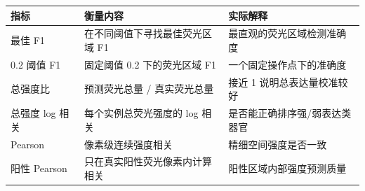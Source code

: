 \begin{tabular}{@{}lll@{}}
\toprule
指标 & 衡量内容 & 实际解释 \\
\midrule
最佳 F1 & 在不同阈值下寻找最佳荧光区域 F1 & 最直观的荧光区域检测准确度 \\
0.2 阈值 F1 & 固定阈值 0.2 下的荧光区域 F1 & 一个固定操作点下的准确度 \\
总强度比 & 预测荧光总量 / 真实荧光总量 & 接近 1 说明总表达量校准较好 \\
总强度 log 相关 & 每个实例总荧光强度的 log 相关 & 是否能正确排序强/弱表达类器官 \\
Pearson & 像素级连续强度相关 & 精细空间强度是否一致 \\
阳性 Pearson & 只在真实阳性荧光像素内计算相关 & 阳性区域内部强度预测质量 \\
\bottomrule
\end{tabular}
